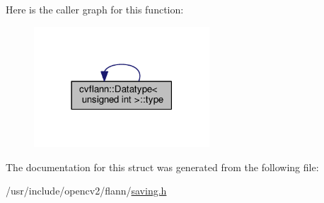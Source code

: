 Here is the caller graph for this function\-:\nopagebreak
\begin{figure}[H]
\begin{center}
\leavevmode
\includegraphics[width=186pt]{structcvflann_1_1Datatype_3_01unsigned_01int_01_4_a5df625cb251ef9d900864c2cfaccbbff_icgraph}
\end{center}
\end{figure}




The documentation for this struct was generated from the following file\-:\begin{DoxyCompactItemize}
\item 
/usr/include/opencv2/flann/\hyperlink{saving_8h}{saving.\-h}\end{DoxyCompactItemize}

